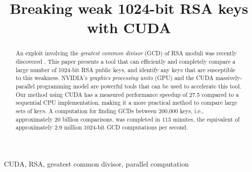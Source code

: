 \documentclass[10pt, conference]{./IEEEtran}
\begin{document}

\title{Breaking weak 1024-bit RSA keys with CUDA}

\author{
}

\maketitle

\begin{abstract}
   An exploit involving the \textit{greatest common divisor} (GCD) of RSA 
   moduli was recently discovered \cite{lenstra:ron}. This paper presents
   a tool that can efficiently and completely compare a large number of 
   1024-bit RSA public keys, and identify
   any keys that are susceptible to this weakness.
   NVIDIA's \textit{graphics processing units} (GPU) and the CUDA 
   massively-parallel programming model are powerful tools that can be used to 
   accelerate this tool. Our method using CUDA has a measured performance 
   speedup of 27.5 compared to a sequential CPU implementation, making it 
   a more practical method to compare large sets of keys.
   A computation for finding GCDs between 200,000 keys, i.e., 
   approximately 20 billion comparisons, was completed in 113 
   minutes, the equivalent of approximately 2.9 million 
   1024-bit GCD computations per second.
\end{abstract}


\begin{IEEEkeywords}
CUDA, RSA, greatest common divisor, parallel computation
\end{IEEEkeywords}
\end{document}
